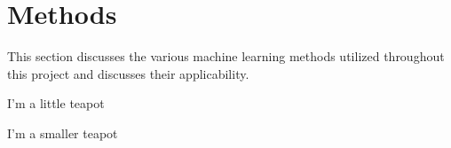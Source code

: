 \chapter{Methods}


This section discusses the various machine learning methods utilized throughout this project 
and discusses their applicability.


I'm a little teapot


I'm a smaller teapot